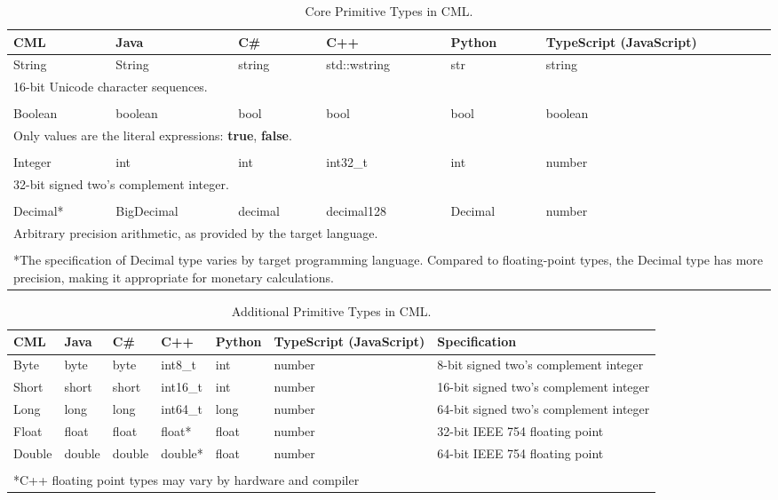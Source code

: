 \begin{table}[h]
\centering
\begin{tabular}
{l l l l l p{2cm} }
\hline
CML & Java & C\# & C++ & Python & TypeScript (JavaScript) \\
\hline
String & String & string & std::wstring & str & string \\
\multicolumn{6}{p{13cm}}{\footnotesize{16-bit Unicode character sequences.}} \\
\\
Boolean & boolean & bool & bool & bool & boolean \\
\multicolumn{6}{p{13cm}}{\footnotesize{Only values are the literal expressions: \textbf{true}, \textbf{false}.}}  \\
\\
Integer & int & int & int32\_t & int & number  \\
\multicolumn{6}{p{13cm}}{\footnotesize{32-bit signed two's complement integer.}}  \\
\\
Decimal* & BigDecimal & decimal & decimal128 & Decimal & number \\
\multicolumn{6}{p{13cm}}{\footnotesize{Arbitrary precision arithmetic, as provided by the target language.}} \\
\\
\multicolumn{6}{p{13cm}}{*The specification of Decimal type varies by target programming language.
Compared to floating-point types, the Decimal type has more precision,
making it appropriate for monetary calculations.}
\end{tabular}
\caption{Core Primitive Types in CML.}
\label{tab:core-primitive-types}
\end{table}

\begin{table}[h]
\centering
\begin{tabular}
{l l l l l p{2cm} p{3.5cm} }
\hline
CML & Java & C\# & C++ & Python & TypeScript (JavaScript) & Specification \\
\hline
Byte & byte & byte & int8\_t & int & number & 8-bit signed two's complement integer \\
Short & short & short & int16\_t & int & number & 16-bit signed two's complement integer \\
Long & long & long & int64\_t & long & number & 64-bit signed two's complement integer \\
Float & float & float & float* & float & number & 32-bit IEEE 754 floating point \\
Double & double & double & double* & float & number & 64-bit IEEE 754 floating point \\
\\
\multicolumn{7}{p{12cm}}{*C++ floating point types may vary by hardware and compiler}
\end{tabular}
\caption{Additional Primitive Types in CML.}
\label{tab:additional-primitive-types}
\end{table}

